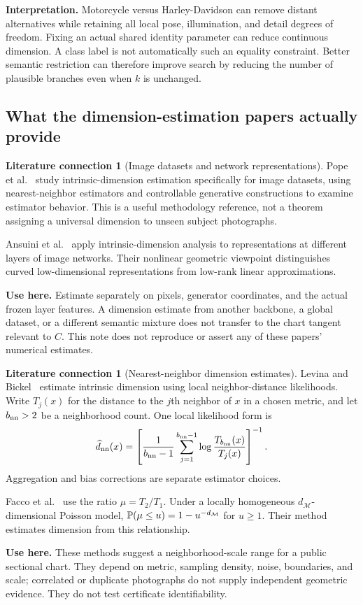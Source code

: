 \documentclass[11pt,a4paper]{article}
\theoremstyle{definition}
\theoremstyle{definition}
\newtheorem{literature}[theorem]{Literature connection}
\theoremstyle{remark}\newtheorem{remark}[theorem]{Remark}
\begin{document}
\textbf{Interpretation.} Motorcycle versus Harley-Davidson can remove distant alternatives while retaining all local pose, illumination, and detail degrees of freedom. Fixing an actual shared identity parameter can reduce continuous dimension. A class label is not automatically such an equality constraint. Better semantic restriction can therefore improve search by reducing the number of plausible branches even when $k$ is unchanged.

\subsection{What the dimension-estimation papers actually provide}

\begin{literature}[Image datasets and network representations]\label{lit:imagedimension}
Pope et al.~\cite{pope} study intrinsic-dimension estimation specifically for image datasets, using nearest-neighbor estimators and controllable generative constructions to examine estimator behavior. This is a useful methodology reference, not a theorem assigning a universal dimension to unseen subject photographs.

Ansuini et al.~\cite{ansuini} apply intrinsic-dimension analysis to representations at different layers of image networks. Their nonlinear geometric viewpoint distinguishes curved low-dimensional representations from low-rank linear approximations.

\textbf{Use here.} Estimate separately on pixels, generator coordinates, and the actual frozen layer features. A dimension estimate from another backbone, a global dataset, or a different semantic mixture does not transfer to the chart tangent relevant to $C$. This note does not reproduce or assert any of these papers' numerical estimates.
\end{literature}

\begin{literature}[Nearest-neighbor dimension estimates]\label{lit:knn}
Levina and Bickel~\cite{levina} estimate intrinsic dimension using local neighbor-distance likelihoods. Write $T_j(x)$ for the distance to the $j$th neighbor of $x$ in a chosen metric, and let $b_{\rm nn}>2$ be a neighborhood count. One local likelihood form is
\[
\widehat d_{\rm nn}(x)=
\left[\frac1{b_{\rm nn}-1}\sum_{j=1}^{b_{\rm nn}-1}
\log\frac{T_{b_{\rm nn}}(x)}{T_j(x)}\right]^{-1}.
\]
Aggregation and bias corrections are separate estimator choices.

Facco et al.~\cite{twonn} use the ratio $\mu=T_2/T_1$. Under a locally homogeneous $d_{\mathcal M}$-dimensional Poisson model,
$\mathbb P(\mu\le u)=1-u^{-d_{\mathcal M}}$ for $u\ge1$.
Their method estimates dimension from this relationship.

\textbf{Use here.} These methods suggest a neighborhood-scale range for a public sectional chart. They depend on metric, sampling density, noise, boundaries, and scale; correlated or duplicate photographs do not supply independent geometric evidence. They do not test certificate identifiability.
\end{literature}
\end{document}
